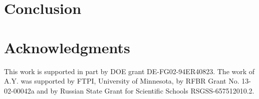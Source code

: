 \documentclass[epsfig,12pt]{article}
\begin{document}
\section{Conclusion}


\section*{Acknowledgments}

	This work  is supported in part by DOE grant DE-FG02-94ER40823. 
	The work of A.Y. was  supported 
	by  FTPI, University of Minnesota, 
	by RFBR Grant No. 13-02-00042a 
	and by Russian State Grant for 
	Scientific Schools RSGSS-657512010.2.
\end{document}
